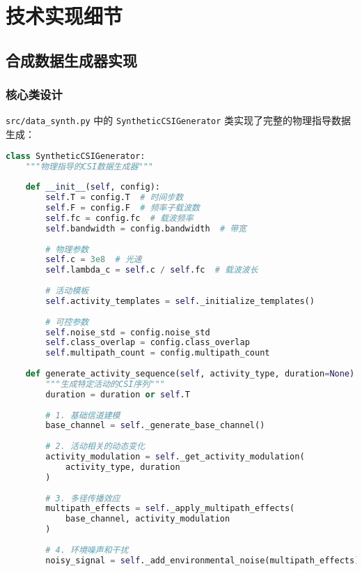 \section{技术实现细节}
\label{sec:technical_details}

\subsection{合成数据生成器实现}
\label{subsec:generator_implementation}

\subsubsection{核心类设计}
\texttt{src/data\_synth.py} 中的 \texttt{SyntheticCSIGenerator} 类实现了完整的物理指导数据生成：

\begin{lstlisting}[language=Python,caption=合成数据生成器核心实现]
class SyntheticCSIGenerator:
    """物理指导的CSI数据生成器"""
    
    def __init__(self, config):
        self.T = config.T  # 时间步数
        self.F = config.F  # 频率子载波数
        self.fc = config.fc  # 载波频率
        self.bandwidth = config.bandwidth  # 带宽
        
        # 物理参数
        self.c = 3e8  # 光速
        self.lambda_c = self.c / self.fc  # 载波波长
        
        # 活动模板
        self.activity_templates = self._initialize_templates()
        
        # 可控参数
        self.noise_std = config.noise_std
        self.class_overlap = config.class_overlap
        self.multipath_count = config.multipath_count
    
    def generate_activity_sequence(self, activity_type, duration=None):
        """生成特定活动的CSI序列"""
        duration = duration or self.T
        
        # 1. 基础信道建模
        base_channel = self._generate_base_channel()
        
        # 2. 活动相关的动态变化
        activity_modulation = self._get_activity_modulation(
            activity_type, duration
        )
        
        # 3. 多径传播效应
        multipath_effects = self._apply_multipath_effects(
            base_channel, activity_modulation
        )
        
        # 4. 环境噪声和干扰
        noisy_signal = self._add_environmental_noise(multipath_effects)
        

\end{lstlisting}
